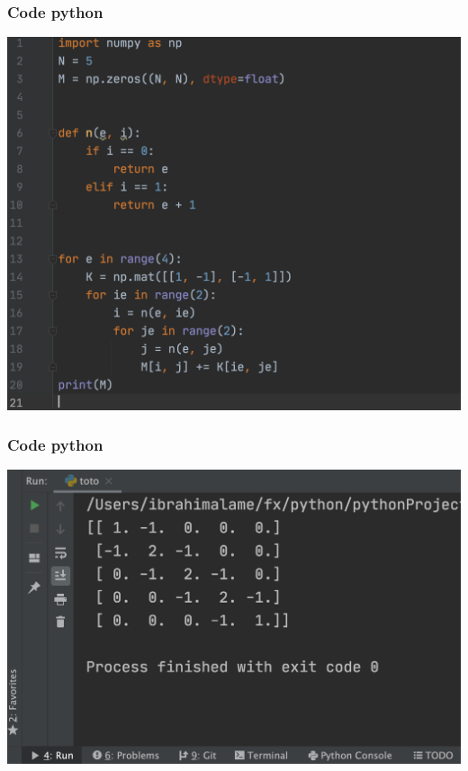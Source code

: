 \documentclass{beamer}
\begin{document}
\begin{frame}
\frametitle{Code python}
\begin{center}
\includegraphics[scale=0.24]{codePython01.png} 
\end{center}

\end{frame}
\begin{frame}
\frametitle{Code python}
\begin{center}
\includegraphics[scale=0.34]{codePython02.png} 
\end{center}

\end{frame}
\end{document}
